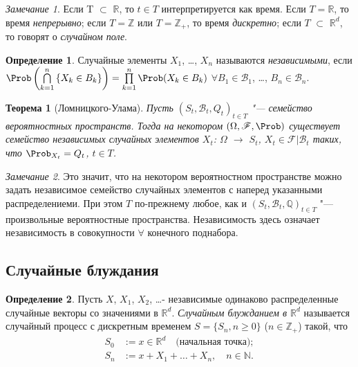 \documentclass[a4paper]{article}
\theoremstyle{plain}
\newtheorem{thm}{Теорема}[section]
\theoremstyle{definition}
\newtheorem{defn}{Определение}[section]
\theoremstyle{remark}
\newtheorem*{rem}{Замечание}
\begin{document}
\begin{rem}
  Если T $\subset$ $\mathbb{R}$, то $t \in T$ интерпретируется как время. Если \linebreak $T = \mathbb{R}$, то время \emph{непрерывно}; если $T = \mathbb{Z}$ или $T = \mathbb{Z}_{+}$, то время \emph{дискретно}; если $T$ $\subset$ $\mathbb{R}^{d}$, то говорят о \emph{случайном поле}.
\end{rem}

\begin{defn}
  Случайные элементы $X_{1}$, \ldots, $X_{n}$ называются \emph{независимыми}, если $\Prob\left(\bigcap\limits_{k=1}^n \left\lbrace X_{k} \in  B_{k}\right\rbrace \right) = \prod\limits_{k=1}^n \Prob(X_{k} \in B_{k})$  $\forall B_{1} \in \mathscr{B}_{1}$, \ldots, $B_{n} \in \mathscr{B}_{n}$.
\end{defn}

\begin{thm}[Ломницкого-Улама]
  Пусть $(S_{t}, \mathscr{B}_{t}, Q_{t})_{t \in  T}$ "--- семейство вероятностных пространств. Тогда на некотором $(\Omega, \mathscr{F}, \Prob)$ существует семейство \emph{независимых} случайных элементов $X_{t}$: $\Omega$ $\rightarrow$ $S_{t}$, $X_{t} \in \mathscr{F}|\mathscr{B}_{t}$ таких, что $\Prob_{X_{t}} = Q_{t}$, $t \in T$.
\end{thm}

\begin{rem}
  Это значит, что на некотором вероятностном пространстве можно задать независимое семейство случайных элементов с наперед указанными распределениеми. При этом $T$ по-прежнему любое, как и $(S_{t}, \mathscr{B}_{t}, \mathbb{Q})_{t \in T}$ "--- произвольные вероятностные пространства. Независимость здесь означает независимость в совокупности $\forall$ конечного поднабора.
\end{rem}

\subsection{Случайные блуждания}

\begin{defn}
  Пусть $X$, $X_{1}$, $X_{2}$, \ldots - независимые одинаково распределенные случайные векторы со значениями в $\mathbb{R}^{d}$. \emph{Случайным блужданием в $\mathbb{R}^{d}$} называется случайный процесс с дискретным временем $S = \lbrace S_{n}, n \geqslant 0 \rbrace$ ($n \in \mathbb{Z}_{+}$) такой, что
  \begin{align*}
    S_{0} &:= x \in \mathbb{R}^{d} \quad\text{(начальная точка)};\\
    S_{n} &:= x + X_{1} + \ldots + X_{n}, \quad n \in \mathbb{N}.
  \end{align*}
\end{defn}
\end{document}
